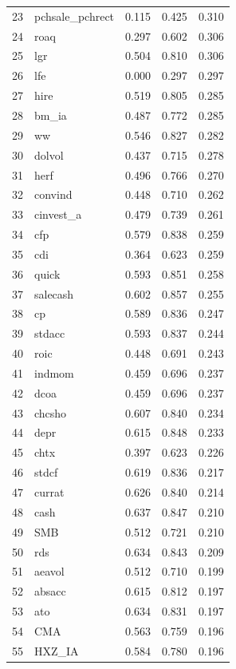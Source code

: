 \documentclass[12pt]{article}
\begin{document}
\begin{footnotesize}
\begin{longtable}{rl|c|c|c}
		23 & pchsale\_pchrect & 0.115 & 0.425 & 0.310 \\ 
		24 & roaq & 0.297 & 0.602 & 0.306 \\ 
		25 & lgr & 0.504 & 0.810 & 0.306 \\ 
		26 & lfe & 0.000 & 0.297 & 0.297 \\ 
		27 & hire & 0.519 & 0.805 & 0.285 \\ 
		28 & bm\_ia & 0.487 & 0.772 & 0.285 \\ 
		29 & ww & 0.546 & 0.827 & 0.282 \\ 
		30 & dolvol & 0.437 & 0.715 & 0.278 \\ 
		31 & herf & 0.496 & 0.766 & 0.270 \\ 
		32 & convind & 0.448 & 0.710 & 0.262 \\ 
		33 & cinvest\_a & 0.479 & 0.739 & 0.261 \\ 
		34 & cfp & 0.579 & 0.838 & 0.259 \\ 
		35 & cdi & 0.364 & 0.623 & 0.259 \\ 
		36 & quick & 0.593 & 0.851 & 0.258 \\ 
		37 & salecash & 0.602 & 0.857 & 0.255 \\ 
		38 & cp & 0.589 & 0.836 & 0.247 \\ 
		39 & stdacc & 0.593 & 0.837 & 0.244 \\ 
		40 & roic & 0.448 & 0.691 & 0.243 \\ 
		41 & indmom & 0.459 & 0.696 & 0.237 \\ 
		42 & dcoa & 0.459 & 0.696 & 0.237 \\ 
		43 & chcsho & 0.607 & 0.840 & 0.234 \\ 
		44 & depr & 0.615 & 0.848 & 0.233 \\ 
		45 & chtx & 0.397 & 0.623 & 0.226 \\ 
		46 & stdcf & 0.619 & 0.836 & 0.217 \\ 
		47 & currat & 0.626 & 0.840 & 0.214 \\ 
		48 & cash & 0.637 & 0.847 & 0.210 \\ 
		49 & SMB & 0.512 & 0.721 & 0.210 \\ 
		50 & rds & 0.634 & 0.843 & 0.209 \\ 
		51 & aeavol & 0.512 & 0.710 & 0.199 \\ 
		52 & absacc & 0.615 & 0.812 & 0.197 \\ 
		53 & ato & 0.634 & 0.831 & 0.197 \\ 
		54 & CMA & 0.563 & 0.759 & 0.196 \\ 
		55 & HXZ\_IA & 0.584 & 0.780 & 0.196 \\ 

\end{longtable}
\end{footnotesize}
\end{document}
